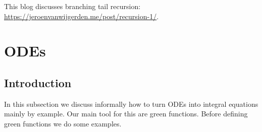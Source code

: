 \documentclass[a4paper,12pt]{article}
\begin{document}

%


\begin{related}
    This blog discusses branching tail recursion:
    \url{https://jeroenvanwijgerden.me/post/recursion-1/}.
\end{related}


\section{ODEs}

%
%


\subsection{Introduction}
In this subsection we discuss informally how to turn ODEs into integral equations mainly
by example.
Our main tool for this are green functions. Before defining green functions
we do some examples.  \\
\end{document}
